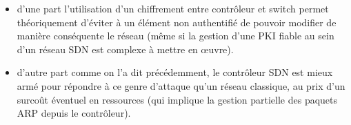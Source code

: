 \begin{itemize}

\item d’une part l’utilisation d’un chiffrement entre contrôleur et switch permet théoriquement d’éviter à un élément non authentifié de pouvoir modifier de manière conséquente le réseau (même si la gestion d’une PKI fiable au sein d’un réseau SDN est complexe à mettre en œuvre).
\item d’autre part comme on l'a dit précédemment, le contrôleur SDN est mieux armé pour répondre à ce genre d’attaque qu’un réseau classique, au prix d'un surcoût éventuel en ressources (qui implique la gestion partielle des paquets ARP depuis le contrôleur).


\end{itemize}